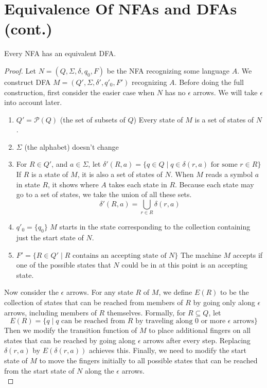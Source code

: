\documentclass[11pt,a4paper]{article}
\begin{document}
\tableofcontents


\section{Equivalence Of NFAs and DFAs (cont.)}
\begin{theorem}
    Every NFA has an equivalent DFA.

    \begin{proof}
        Let $N=(Q,\Sigma,\delta,q_0, F)$ be the NFA recognizing some language $A$. We construct DFA $M=(Q',\Sigma,\delta',q'_0,F')$ recognizing $A$.
        Before doing the full construction, first consider the easier case when $N$ has no $\epsilon$ arrows. We will take $\epsilon$ into account later.

        \begin{enumerate}
            \item $Q'=\mathcal{P}(Q)$ (the set of subsets of $Q$)
            \subitem Every state of $M$ is a set of states of $N$.
            \item $\Sigma$ (the alphabet) doesn't change
            \item For $R\in Q'$, and $a\in\Sigma$, let $\delta'(R,a)=\{q\in Q\mid q\in\delta(r,a)\text{ for some }r\in R\}$
            \subitem If $R$ is a state of $M$, it is also a set of states of $N$. When $M$ reads a symbol $a$ in state $R$, it shows where $A$ takes each state in $R$. Because each state may go to a set of states, we take the union of all these sets.
            $$\delta'(R,a)=\bigcup\limits_{r\in R}\delta(r,a)$$
            \item $q'_0=\{q_0\}$
            \subitem $M$ starts in the state corresponding to the collection containing just the start state of $N$.
            \item $F'=\{R\in Q'\mid R\text{ contains an accepting state of }N\}$
            \subitem The machine $M$ accepts if one of the possible states that $N$ could be in at this point is an accepting state.
        \end{enumerate}

        Now consider the $\epsilon$ arrows. For any state $R$ of $M$, we define $E(R)$ to be the collection of states that can be reached from members of $R$ by going only along $\epsilon$ arrows, including members of $R$ themselves.
        Formally, for $R\subseteq Q$, let $$E(R)=\{q\mid q\text{ can be reached from $R$ by traveling along 0 or more $\epsilon$ arrows}\}$$
        Then we modify the transition function of $M$ to place additional fingers on all states that can be reached by going along $\epsilon$ arrows after every step. Replacing $\delta(r,a)$ by $E(\delta(r,a))$ achieves this.
        Finally, we need to modify the start state of $M$ to move the fingers initially to all possible states that can be reached from the start state of $N$ along the $\epsilon$ arrows. \\
        

\end{proof}
\end{theorem}
\end{document}
